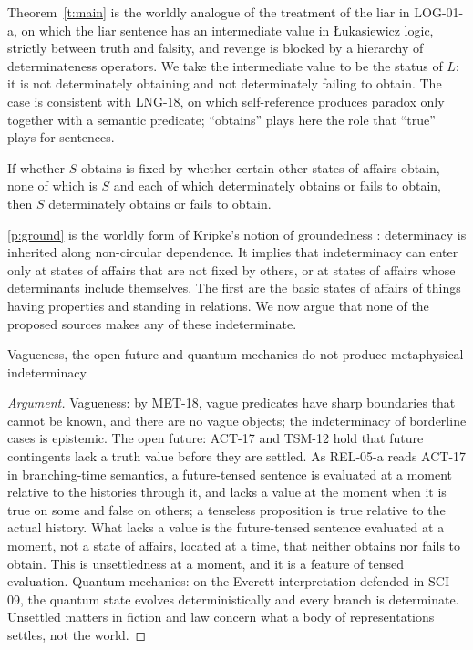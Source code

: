 \documentclass{situationist-preprint}
\begin{document}
Theorem~\ref{t:main} is the worldly analogue of the treatment of the liar in LOG-01-a, on which the liar sentence has an intermediate value in Łukasiewicz logic, strictly between truth and falsity, and revenge is blocked by a hierarchy of determinateness operators. We take the intermediate value to be the status of $L$: it is not determinately obtaining and not determinately failing to obtain. The case is consistent with LNG-18, on which self-reference produces paradox only together with a semantic predicate; \enquote{obtains} plays here the role that \enquote{true} plays for sentences.

\begin{principle}\label{p:ground}
If whether $S$ obtains is fixed by whether certain other states of affairs obtain, none of which is $S$ and each of which determinately obtains or fails to obtain, then $S$ determinately obtains or fails to obtain.
\end{principle}

\ref{p:ground} is the worldly form of Kripke's notion of groundedness \citep{Kripke1975}: determinacy is inherited along non-circular dependence. It implies that indeterminacy can enter only at states of affairs that are not fixed by others, or at states of affairs whose determinants include themselves. The first are the basic states of affairs of things having properties and standing in relations. We now argue that none of the proposed sources makes any of these indeterminate.

\begin{proposition}\label{p:restrict}
Vagueness, the open future and quantum mechanics do not produce metaphysical indeterminacy.
\end{proposition}

\begin{proof}[Argument]
Vagueness: by MET-18, vague predicates have sharp boundaries that cannot be known, and there are no vague objects; the indeterminacy of borderline cases is epistemic. The open future: ACT-17 and TSM-12 hold that future contingents lack a truth value before they are settled. As REL-05-a reads ACT-17 in branching-time semantics, a future-tensed sentence is evaluated at a moment relative to the histories through it, and lacks a value at the moment when it is true on some and false on others; a tenseless proposition is true relative to the actual history. What lacks a value is the future-tensed sentence evaluated at a moment, not a state of affairs, located at a time, that neither obtains nor fails to obtain. This is unsettledness at a moment, and it is a feature of tensed evaluation. Quantum mechanics: on the Everett interpretation defended in SCI-09, the quantum state evolves deterministically and every branch is determinate. Unsettled matters in fiction and law concern what a body of representations settles, not the world.
\end{proof}
\end{document}
